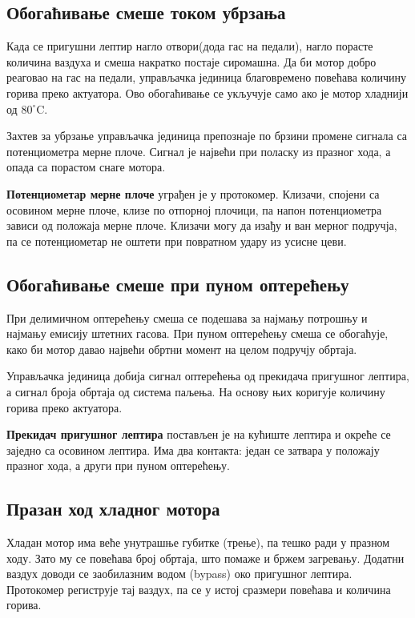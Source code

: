 \documentclass{report}
\begin{document}
\subsection{Обогаћивање смеше током убрзања}

Када се пригушни лептир нагло отвори(дода гас на педали), нагло порасте количина ваздуха и смеша
накратко постаје сиромашна. Да би мотор добро реаговао на гас на педали, управљачка
јединица благовремено повећава количину горива преко актуатора. Ово
обогаћивање се укључује само ако је мотор хладнији од $80^\circ$C.

Захтев за убрзање управљачка јединица препознаје по брзини промене сигнала са
потенциометра мерне плоче. Сигнал је највећи при поласку из празног хода, а
опада са порастом снаге мотора.

\textbf{Потенциометар мерне плоче} уграђен је у протокомер. Клизачи, спојени
са осовином мерне плоче, клизе по отпорној плочици, па напон потенциометра
зависи од положаја мерне плоче. Клизачи могу да изађу и ван мерног подручја,
па се потенциометар не оштети при повратном удару из усисне цеви.

\subsection{Обогаћивање смеше при пуном оптерећењу}

При делимичном оптерећењу смеша се подешава за најмању потрошњу и најмању
емисију штетних гасова. При пуном оптерећењу смеша се обогаћује, како би
мотор давао највећи обртни момент на целом подручју обртаја.

Управљачка јединица добија сигнал оптерећења од прекидача пригушног лептира,
а сигнал броја обртаја од система паљења. На основу њих коригује количину
горива преко актуатора.

\textbf{Прекидач пригушног лептира} постављен је на кућиште лептира и окреће
се заједно са осовином лептира. Има два контакта: један се затвара у
положају празног хода, а други при пуном оптерећењу.

\subsection{Празан ход хладног мотора}

Хладан мотор има веће унутрашње губитке (трење), па тешко ради у празном
ходу. Зато му се повећава број обртаја, што помаже и бржем загревању.
Додатни ваздух доводи се заобилазним водом (bypass) око пригушног лептира.
Протокомер региструје тај ваздух, па се у истој сразмери повећава и количина
горива.
\end{document}
